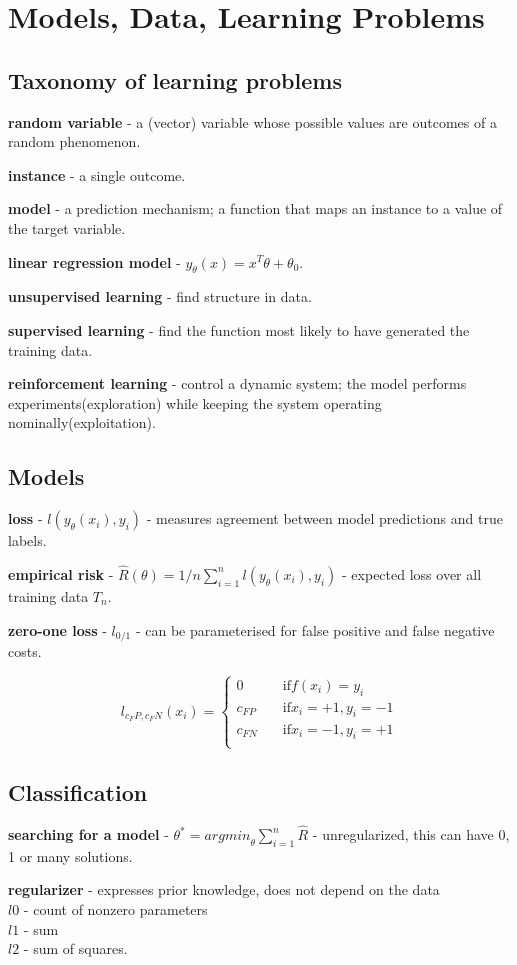 \documentclass{article}
\newcommand{\para}[0]{\par\vspace{0.2cm}\noindent}
\newcommand{\define}[2]{\textbf{#1} - {#2}.  \para}
\begin{document}
\section{Models, Data, Learning Problems}
\subsection{Taxonomy of learning problems}
\define{random variable}
           {a (vector) variable whose possible values are outcomes of a random phenomenon}
\define{instance}
           {a single outcome}
\define{model}
           {a prediction mechanism; a function that maps an instance to a value of the target variable}
\define{linear regression model}
           {$y_\theta(x) = x^T \theta + \theta_0$}
\define{unsupervised learning}
           {find structure in data}
\define{supervised learning}
           {find the function most likely to have generated the training data}
\define{reinforcement learning}
           {control a dynamic system; the model performs experiments(exploration) while keeping the system operating nominally(exploitation)}


\subsection{Models}
\define{loss}
           {$l(y_\theta(x_i), y_i)$ - measures agreement between model predictions and true labels}
\define{empirical risk}
           {$\hat R(\theta) = 1/n \sum_{i=1}^n l(y_\theta(x_i), y_i)$ - expected loss over all training data $T_n$}
\define{zero-one loss}
           {$l_{0/1}$ - can be parameterised for false positive and false negative costs}
$$l_{c_FP, c_FN}(x_i) =
  \begin{cases}
    0         & \quad \mathrm{if } f(x_i) = y_i  \\
    c_{FP}    & \quad \mathrm{if } x_i = +1, y_i = -1  \\
    c_{FN}    & \quad \mathrm{if } x_i = -1, y_i = +1  \\
  \end{cases}$$


\subsection{Classification}
\define{searching for a model}
           {$\theta^* = {argmin}_\theta \sum_{i=1}^n \hat R$ - unregularized, this can have 0, 1 or many solutions}

\define{regularizer}
           {expresses prior knowledge, does not depend on the data  \\
            $l0$ - count of nonzero parameters  \\
            $l1$ - sum  \\
            $l2$ - sum of squares}
\end{document}
